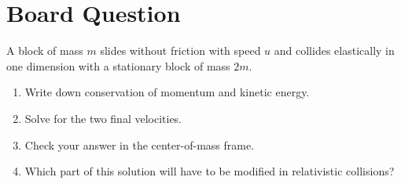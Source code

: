 \documentclass[12pt]{article}
\newif\ifshowboardanswers
\newcommand{\boardanswer}[1]{\ifshowboardanswers\\[0.35em]\textcolor{blue}{\textbf{Answer.} #1}\fi}
\begin{document}
\section*{Board Question}
\begin{tcolorbox}[colback=blue!5!white]
A block of mass $m$ slides without friction with speed $u$ and collides elastically in one dimension with a stationary block of mass $2m$.
\begin{enumerate}
    \item Write down conservation of momentum and kinetic energy.
    \boardanswer{$mu=mv_1+2mv_2$ and $\frac12mu^2=\frac12mv_1^2+\frac12(2m)v_2^2$.}
    \item Solve for the two final velocities.
    \boardanswer{For a 1D elastic collision, $v_1=(m-2m)/(m+2m)u=-u/3$ and $v_2=2m/(m+2m)u=2u/3$.}
    \item Check your answer in the center-of-mass frame.
    \boardanswer{$V_{\rm CM}=u/3$. In the CM frame the velocities reverse; transforming back gives $v_1=-u/3$ and $v_2=2u/3$.}
    \item Which part of this solution will have to be modified in relativistic collisions?
    \boardanswer{Momentum and energy must be replaced by relativistic momentum and total energy; kinetic energy alone is not the conserved energy.}
\end{enumerate}
\end{tcolorbox}
\fi
\end{document}
